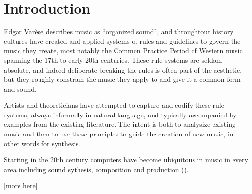 \section{Introduction}
\label{sec:intro}

Edgar Var\`{e}se describes music as ``organized sound'', and
throughtout history cultures have created and applied systems of rules
and guidelines to govern the music they create, most notably the
Common Practice Period of Western music spanning the 17th to early
20th centuries. These rule systems are seldom absolute, and indeed
deliberate breaking the rules is often part of the aesthetic, but they
roughly constrain the music they apply to and give it a common form
and sound.

Artists and theoreticians have attempted to capture and codify these
rule systems, always informally in natural language, and typically
accompanied by examples from the existing literature. The intent is
both to analysize existing music and then to use these principles to
guide the creation of new music, in other words for synthesis.

Starting in the 20th century computers have become ubiquitous in
music in every area including sound sythesis, composition and
production (\citep{roads-tutorial}).

[more here]

